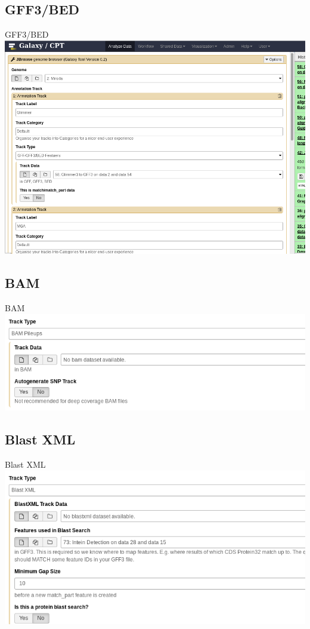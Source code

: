 \documentclass[12pt]{beamer} %
\begin{document}
\subsection{GFF3/BED}
\begin{frame}{GFF3/BED}
	\centering
	\includegraphics[width=\textwidth,height=0.8\textheight,keepaspectratio]{snapshot12.png}
\end{frame}

\subsection{BAM}
\begin{frame}{BAM}
	\centering
	\includegraphics[width=\textwidth,height=0.8\textheight,keepaspectratio]{snapshot13.png}
\end{frame}

\subsection{Blast XML}
\begin{frame}{Blast XML}
	\centering
	\includegraphics[width=\textwidth,height=0.8\textheight,keepaspectratio]{snapshot14.png}
\end{frame}
\end{document}
